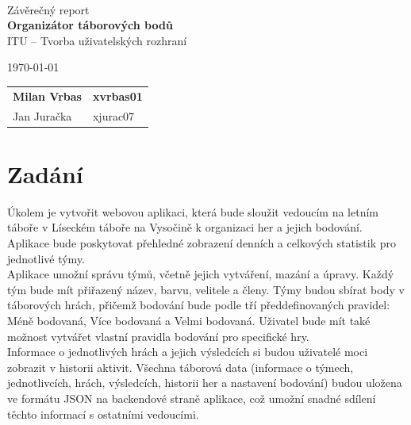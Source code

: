 \documentclass[a4paper, 12pt]{article} %
\begin{document}
\begin{titlepage}
    \begin{center}
         \\
        \Huge{Závěrečný report} \\
        \Large{\textbf{Organizátor táborových bodů}} \\
        \large{ITU – Tvorba uživatelských rozhraní }
    \end{center}

    {\large \today \hfill
        \large
        \begin{tabular}{l l}
        \textbf{Milan Vrbas} & \quad \textbf{xvrbas01}\\
        Jan Juračka           & \quad xjurac07      \\
        \end{tabular}
        }
\end{titlepage}

\tableofcontents
\thispagestyle{empty}
\newpage

\section{Zadání}
Úkolem je vytvořit webovou aplikaci, která bude sloužit vedoucím na letním táboře v 
Líseckém táboře na Vysočině k organizaci her a jejich bodování. Aplikace bude poskytovat 
přehledné zobrazení denních a celkových statistik pro jednotlivé týmy. \\
Aplikace umožní správu týmů, včetně jejich vytváření, mazání a úpravy. Každý tým bude mít 
přiřazený název, barvu, velitele a členy. Týmy budou sbírat body v táborových hrách, přičemž 
bodování bude podle tří předdefinovaných pravidel: Méně bodovaná, Více bodovaná a Velmi bodovaná. 
Uživatel bude mít také možnost vytvářet vlastní pravidla bodování pro specifické hry. \\
Informace o jednotlivých hrách a jejich výsledcích si budou uživatelé moci zobrazit v 
historii aktivit. Všechna táborová data (informace o týmech, jednotlivcích, 
hrách, výsledcích, historii her a nastavení bodování) budou uložena ve formátu JSON na 
backendové straně aplikace, což umožní snadné sdílení těchto informací s ostatními vedoucími.
\end{document}
